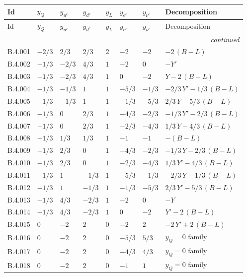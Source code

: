{\scriptsize\setlength{\tabcolsep}{3pt}
\begin{longtable}{@{}lllllll>{\raggedright\arraybackslash}p{5.6cm}@{}}
\toprule
Id & $y_Q$ & $y_{u^c}$ & $y_{d^c}$ & $y_L$ & $y_{e^c}$ & $y_{\nu^c}$ & Decomposition \\
\midrule\endfirsthead
\toprule
Id & $y_Q$ & $y_{u^c}$ & $y_{d^c}$ & $y_L$ & $y_{e^c}$ & $y_{\nu^c}$ & Decomposition \\
\midrule\endhead
\midrule\multicolumn{8}{r}{\emph{continued}}\\\endfoot
\bottomrule\endlastfoot
B.4.001 & $-2/3$ & $2/3$ & $2/3$ & $2$ & $-2$ & $-2$ & $-2\,(B{-}L)$ \\
B.4.002 & $-1/3$ & $-2/3$ & $4/3$ & $1$ & $-2$ & $0$ & $-Y'$ \\
B.4.003 & $-1/3$ & $-2/3$ & $4/3$ & $1$ & $0$ & $-2$ & $Y-2\,(B{-}L)$ \\
B.4.004 & $-1/3$ & $-1/3$ & $1$ & $1$ & $-5/3$ & $-1/3$ & $-2/3\,Y'-1/3\,(B{-}L)$ \\
B.4.005 & $-1/3$ & $-1/3$ & $1$ & $1$ & $-1/3$ & $-5/3$ & $2/3\,Y-5/3\,(B{-}L)$ \\
B.4.006 & $-1/3$ & $0$ & $2/3$ & $1$ & $-4/3$ & $-2/3$ & $-1/3\,Y'-2/3\,(B{-}L)$ \\
B.4.007 & $-1/3$ & $0$ & $2/3$ & $1$ & $-2/3$ & $-4/3$ & $1/3\,Y-4/3\,(B{-}L)$ \\
B.4.008 & $-1/3$ & $1/3$ & $1/3$ & $1$ & $-1$ & $-1$ & $-(B{-}L)$ \\
B.4.009 & $-1/3$ & $2/3$ & $0$ & $1$ & $-4/3$ & $-2/3$ & $-1/3\,Y-2/3\,(B{-}L)$ \\
B.4.010 & $-1/3$ & $2/3$ & $0$ & $1$ & $-2/3$ & $-4/3$ & $1/3\,Y'-4/3\,(B{-}L)$ \\
B.4.011 & $-1/3$ & $1$ & $-1/3$ & $1$ & $-5/3$ & $-1/3$ & $-2/3\,Y-1/3\,(B{-}L)$ \\
B.4.012 & $-1/3$ & $1$ & $-1/3$ & $1$ & $-1/3$ & $-5/3$ & $2/3\,Y'-5/3\,(B{-}L)$ \\
B.4.013 & $-1/3$ & $4/3$ & $-2/3$ & $1$ & $-2$ & $0$ & $-Y$ \\
B.4.014 & $-1/3$ & $4/3$ & $-2/3$ & $1$ & $0$ & $-2$ & $Y'-2\,(B{-}L)$ \\
B.4.015 & $0$ & $-2$ & $2$ & $0$ & $-2$ & $2$ & $-2\,Y'+2\,(B{-}L)$ \\
B.4.016 & $0$ & $-2$ & $2$ & $0$ & $-5/3$ & $5/3$ & $y_Q=0$ family \\
B.4.017 & $0$ & $-2$ & $2$ & $0$ & $-4/3$ & $4/3$ & $y_Q=0$ family \\
B.4.018 & $0$ & $-2$ & $2$ & $0$ & $-1$ & $1$ & $y_Q=0$ family \\

\end{longtable}}
